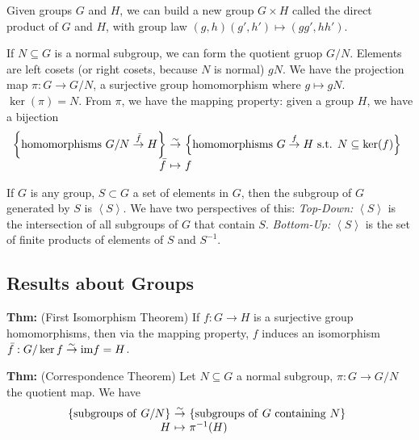 \documentclass[10pt,letterpaper]{article}
\newcommand{\n}{\hfill\break}
\newcommand{\hangblock}[2]{\par\noindent\settowidth{\hangindent}{\textbf{#1: }}\textbf{#1: }\!\!\!#2}
\newcommand{\thm}[1]{\hangblock{Thm}{#1}}
\newcommand{\ptxt}[1]{\textrm{\textnormal{#1}}}
\newcommand{\set}[1]{\left\{#1\right\}}
\newcommand{\inv}{^{-1}}
\newcommand{\im}{\textrm{\textnormal{im}}}
\newcommand{\generated}[1]{\left<#1\right>}
\newcommand{\isom}[4]{\!\!\!\begin{array}[t]{rcl}#1 & \!\!\!\!\overset{\sim}{\to} & \!\!\!\!#2\\ #3 & \!\!\!\!\mapsto & \!\!\!\!#4\end{array}}
\newcommand{\st}{s.t.}
\begin{document}
\par\noindent
Given groups $G$ and $H$, we can build a new group $G\times{}H$ called the direct product of $G$ and $H$, with group law $(g,h)(g',h')\mapsto(gg',hh')$.\n

\par\noindent
If $N\subseteq{}G$ is a normal subgroup, we can form the quotient gruop $G/N$. Elements are left cosets (or right cosets, because $N$ is normal) $gN$. We have the projection map $\pi:G\to{}G/N$, a surjective group homomorphism where $g\mapsto{}gN$. $\ker(\pi)=N$. From $\pi$, we have the mapping property: given a group $H$, we have a bijection
\[
	\isom{\set{\ptxt{homomorphisms }G/N\overset{\bar{f}}{\to}H}}{\set{\ptxt{homomorphisms }G\overset{f}{\to}H\ptxt{ \st{} }N\subseteq\ker(f)}}{\bar{f}}{f}
\]
\begin{center}
\end{center}

\par\noindent
If $G$ is any group, $S\subset{}G$ a set of elements in $G$, then the subgroup of $G$ generated by $S$ is $\generated{S}$. We have two perspectives of this:\n
\textit{Top-Down:} $\generated{S}$ is the intersection of all subgroups of $G$ that contain $S$.\n
\textit{Bottom-Up:} $\generated{S}$ is the set of finite products of elements of $S$ and $S\inv$.\n

\subsection*{Results about Groups}

\thm{
	(First Isomorphism Theorem) If $f:G\to{}H$ is a surjective group homomorphisms, then via the mapping property, $f$ induces an isomorphism $\bar{f}:G/\ker{}f\overset{\sim}{\to}\im{}f=H$.\n
}

\begin{center}
\end{center}

\thm{
	(Correspondence Theorem) Let $N\subseteq{}G$ a normal subgroup, $\pi:G\to{}G/N$ the quotient map. We have
	\[
		\isom{\set{\ptxt{subgroups of }G/N}}{\set{\ptxt{subgroups of }G\ptxt{ containing }N}}{H}{\pi\inv(H)}
	\]
}
\end{document}
